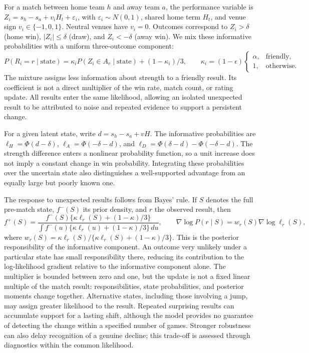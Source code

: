 For a match between home team $h$ and away team $a$, the performance variable is $Z_i=s_h-s_a+v_iH_t+\varepsilon_i$, with $\varepsilon_i\sim N(0,1)$, shared home term $H_t$, and venue sign $v_i\in\{-1,0,1\}$. Neutral venues have $v_i=0$. Outcomes correspond to $Z_i>\delta$ (home win), $|Z_i|\leq\delta$ (draw), and $Z_i<-\delta$ (away win). We mix these informative probabilities with a uniform three-outcome component:
\begin{equation}
 P(R_i=r\mid\mathrm{state})=\kappa_i P(Z_i\in A_r\mid\mathrm{state})+(1-\kappa_i)/3,\qquad
 \kappa_i=(1-\epsilon)\begin{cases}\alpha,&\text{friendly},\\1,&\text{otherwise}.\end{cases}
 \label{eq:rating-likelihood}
\end{equation}
The mixture assigns less information about strength to a friendly result. Its coefficient is not a direct multiplier of the win rate, match count, or rating update. All results enter the same likelihood, allowing an isolated unexpected result to be attributed to noise and repeated evidence to support a persistent change.

For a given latent state, write $d=s_h-s_a+vH$. The informative probabilities are $\ell_H=\Phi(d-\delta)$, $\ell_A=\Phi(-\delta-d)$, and $\ell_D=\Phi(\delta-d)-\Phi(-\delta-d)$. The strength difference enters a nonlinear probability function, so a unit increase does not imply a constant change in win probability. Integrating these probabilities over the uncertain state also distinguishes a well-supported advantage from an equally large but poorly known one.

The response to unexpected results follows from Bayes' rule. If $S$ denotes the full pre-match state, $f^-(S)$ its prior density, and $r$ the observed result, then
\begin{equation}
 f^+(S)=\frac{f^-(S)\{\kappa\ell_r(S)+(1-\kappa)/3\}}{\int f^-(u)\{\kappa\ell_r(u)+(1-\kappa)/3\}\,du},\qquad
 \nabla\log P(r\mid S)=w_r(S)\nabla\log\ell_r(S),
 \label{eq:robust-learning}
\end{equation}
where $w_r(S)=\kappa\ell_r(S)/\{\kappa\ell_r(S)+(1-\kappa)/3\}$. This is the posterior responsibility of the informative component. An outcome very unlikely under a particular state has small responsibility there, reducing its contribution to the log-likelihood gradient relative to the informative component alone. The multiplier is bounded between zero and one, but the update is not a fixed linear multiple of the match result: responsibilities, state probabilities, and posterior moments change together. Alternative states, including those involving a jump, may assign greater likelihood to the result. Repeated surprising results can accumulate support for a lasting shift, although the model provides no guarantee of detecting the change within a specified number of games. Stronger robustness can also delay recognition of a genuine decline; this trade-off is assessed through diagnostics within the common likelihood.

